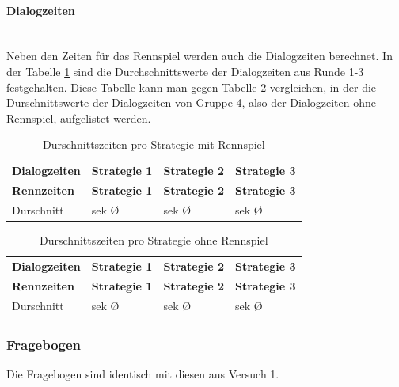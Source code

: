 \documentclass[12pt,a4paper]{scrartcl}
\begin{document}
\paragraph{Dialogzeiten}
~\\
Neben den Zeiten für das Rennspiel werden auch die Dialogzeiten berechnet. 
In der Tabelle \ref{Dialogzeiten2} sind die Durchschnittswerte der Dialogzeiten aus Runde 1-3 festgehalten. Diese Tabelle kann man gegen Tabelle \ref{DialogzeitenKCL2} vergleichen, in der die Durschnittswerte der Dialogzeiten von Gruppe 4, also der Dialogzeiten ohne Rennspiel, aufgelistet werden. 

\begin{longtable}{p{3cm}p{3cm}p{3cm}p{3cm} }
	\label{Dialogzeiten2}\\
	\caption[Durschnittszeiten pro Strategie]{Durschnittszeiten pro Strategie mit Rennspiel}\\
	\hline
	\textbf{Dialogzeiten}&\textbf{Strategie 1}&\textbf{Strategie 2} &\textbf{Strategie 3}\\
	\hline
	\endfirsthead
	\hline
	\textbf{Rennzeiten}&\textbf{Strategie 1}&\textbf{Strategie 2} &\textbf{Strategie 3}\\
	\hline
	\endhead
Durschnitt & sek \O & sek \O & sek \O \\


\hline
\end{longtable}

\begin{longtable}{p{3cm}p{3cm}p{3cm}p{3cm} }
	\label{DialogzeitenKCL2}\\
	\caption[Durschnittszeiten pro Strategie]{Durschnittszeiten pro Strategie ohne Rennspiel}\\
	\hline
	\textbf{Dialogzeiten}&\textbf{Strategie 1}&\textbf{Strategie 2} &\textbf{Strategie 3}\\
	\hline
	\endfirsthead
	\hline
	\textbf{Rennzeiten}&\textbf{Strategie 1}&\textbf{Strategie 2} &\textbf{Strategie 3}\\
	\hline
	\endhead
Durschnitt & sek \O & sek \O & sek \O \\


\hline
\end{longtable}

\subsubsection{Fragebogen}
\label{fragebogen}
Die Fragebogen sind identisch mit diesen aus Versuch 1.
\end{document}

